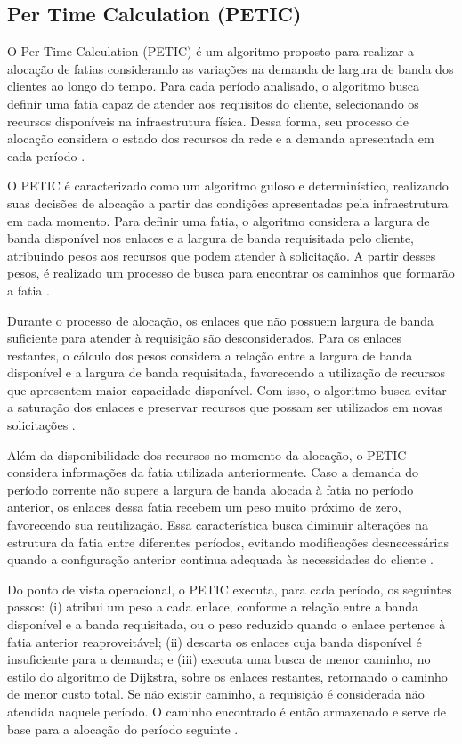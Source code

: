 
\subsection{Per Time Calculation (PETIC)}

O Per Time Calculation (PETIC) é um algoritmo proposto para realizar a alocação de fatias considerando as variações na demanda de largura de banda dos clientes ao longo do tempo. Para cada período analisado, o algoritmo busca definir uma fatia capaz de atender aos requisitos do cliente, selecionando os recursos disponíveis na infraestrutura física. Dessa forma, seu processo de alocação considera o estado dos recursos da rede e a demanda apresentada em cada período \cite{gomes2018fatiamento}.

O PETIC é caracterizado como um algoritmo guloso e determinístico, realizando suas decisões de alocação a partir das condições apresentadas pela infraestrutura em cada momento. Para definir uma fatia, o algoritmo considera a largura de banda disponível nos enlaces e a largura de banda requisitada pelo cliente, atribuindo pesos aos recursos que podem atender à solicitação. A partir desses pesos, é realizado um processo de busca para encontrar os caminhos que formarão a fatia \cite{gomes2018fatiamento}.

Durante o processo de alocação, os enlaces que não possuem largura de banda suficiente para atender à requisição são desconsiderados. Para os enlaces restantes, o cálculo dos pesos considera a relação entre a largura de banda disponível e a largura de banda requisitada, favorecendo a utilização de recursos que apresentem maior capacidade disponível. Com isso, o algoritmo busca evitar a saturação dos enlaces e preservar recursos que possam ser utilizados em novas solicitações \cite{gomes2018fatiamento}.

Além da disponibilidade dos recursos no momento da alocação, o PETIC considera informações da fatia utilizada anteriormente. Caso a demanda do período corrente não supere a largura de banda alocada à fatia no período anterior, os enlaces dessa fatia recebem um peso muito próximo de zero, favorecendo sua reutilização. Essa característica busca diminuir alterações na estrutura da fatia entre diferentes períodos, evitando modificações desnecessárias quando a configuração anterior continua adequada às necessidades do cliente \cite{gomes2018fatiamento}.

Do ponto de vista operacional, o PETIC executa, para cada período, os seguintes passos: (i) atribui um peso a cada enlace, conforme a relação entre a banda disponível e a banda requisitada, ou o peso reduzido quando o enlace pertence à fatia anterior reaproveitável; (ii) descarta os enlaces cuja banda disponível é insuficiente para a demanda; e (iii) executa uma busca de menor caminho, no estilo do algoritmo de Dijkstra, sobre os enlaces restantes, retornando o caminho de menor custo total. Se não existir caminho, a requisição é considerada não atendida naquele período. O caminho encontrado é então armazenado e serve de base para a alocação do período seguinte \cite{gomes2018fatiamento}.
